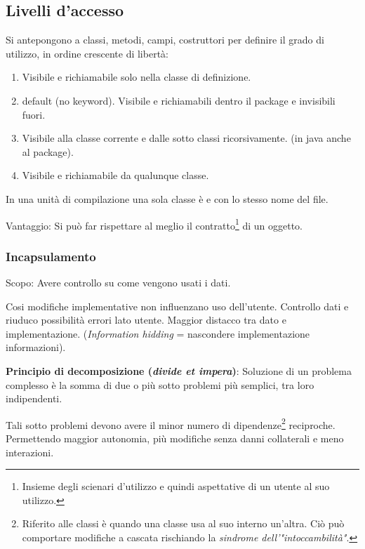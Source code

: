 \subsection{Livelli d'accesso}
Si antepongono a classi, metodi, campi, costruttori per definire il grado di utilizzo, in ordine crescente di libertà:
\begin{enumerate}
	\item {} Visibile e richiamabile solo nella classe di definizione.
	\item {} default (no keyword). Visibile e richiamabili dentro il package e invisibili fuori.
	\item {} Visibile alla classe corrente e dalle sotto classi ricorsivamente. (in java anche al package).
	\item {} Visibile e richiamabile da qualunque classe.
\end{enumerate}

In una unità di compilazione una sola classe è  e con lo stesso nome del file.

Vantaggio: Si può far rispettare al meglio il contratto\footnote{Insieme degli scienari d'utilizzo e quindi aspettative di un utente al suo utilizzo.} di un oggetto.

\subsubsection{Incapsulamento}
\begin{center}
	Scopo: Avere controllo su come vengono usati i dati.
\end{center}


Cosi modifiche implementative non influenzano uso dell'utente. Controllo dati e riuduco possibilità errori lato utente. Maggior distacco tra dato e implementazione. (\textit{Information hidding} = nascondere implementazione informazioni).

\bigskip

\textbf{Principio di decomposizione (\textit{divide et impera})}: Soluzione di un problema complesso è la somma di due o più sotto problemi più semplici, tra loro indipendenti.

Tali sotto problemi devono avere il minor numero di dipendenze\footnote{Riferito alle classi è quando una classe usa al suo interno un'altra. Ciò può comportare modifiche a cascata rischiando la \textit{sindrome dell'"intoccambilità"}.} reciproche. Permettendo maggior autonomia, più modifiche senza danni collaterali e meno interazioni.

